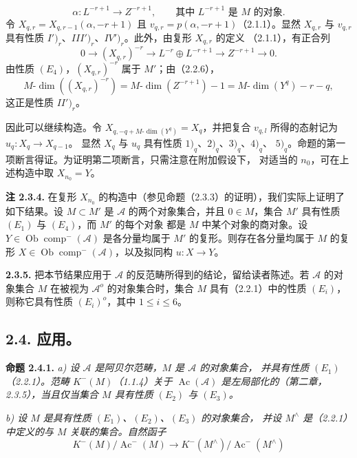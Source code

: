 \clearpage
{}%
\begingroup\small\setlength{\parskip}{0pt}\setlength{\emergencystretch}{1.5em}
\setlength{\abovedisplayskip}{4pt plus 2pt minus 2pt}%
\setlength{\belowdisplayskip}{4pt plus 2pt minus 2pt}%

\[
\alpha\colon L^{-r+1}\longrightarrow Z^{-r+1},
\qquad\text{其中 }L^{-r+1}\text{ 是 }M\text{ 的对象}.
\]
令 $X_{q,r}=X_{q,r-1}(\alpha,-r+1)$ 且
$v_{q,r}=p(\alpha,-r+1)$（2.1.1）。显然 $X_{q,r}$ 与 $v_{q,r}$ 具有性质
$I')_r$、$III')_r$、$IV')_r$。此外，由复形 $X_{q,r}$ 的定义
（2.1.1），有正合列
\[
0\longrightarrow (X_{q,r})^{-r}\longrightarrow
L^{-r}\oplus L^{-r+1}\longrightarrow Z^{-r+1}\longrightarrow0.
\]
由性质 $(E_4)$，$(X_{q,r})^{-r}$ 属于 $M'$；由（2.2.6），
\[
M\text{-}\dim((X_{q,r})^{-r})
=M\text{-}\dim(Z^{-r+1})-1
=M\text{-}\dim(Y^q)-r-q,
\]
这正是性质 $II')_r$。

因此可以继续构造。令 $X_{q,-q+M\text{-}\dim(Y^q)}=X_q$，并把复合
$v_{q,l}$ 所得的态射记为 $u_q\colon X_q\longrightarrow X_{q-1}$。
显然 $X_q$ 与 $u_q$ 具有性质 $1)_q$、$2)_q$、$3)_q$、$4)_q$、
$5)_q$。命题的第一项断言得证。为证明第二项断言，只需注意在附加假设下，
对适当的 $n_0$，可在上述构造中取 $X_{n_0}=Y$。

\medskip\noindent\textbf{注 2.3.4.}\quad
在复形 $X_{n_0}$ 的构造中（参见命题（2.3.3）的证明），我们实际上证明了
如下结果。设 $M\subset M'$ 是 $\mathcal A$ 的两个对象集合，并且
$0\in M$，集合 $M'$ 具有性质 $(E_1)$ 与 $(E_4)$，而 $M'$ 的每个对象
都是 $M$ 中某个对象的商对象。设
$Y\in\operatorname{Ob}\operatorname{comp}^{-}(\mathcal A)$ 是各分量均属于
$M'$ 的复形。则存在各分量均属于 $M$ 的复形
$X\in\operatorname{Ob}\operatorname{comp}^{-}(\mathcal A)$，以及拟同构
$u\colon X\longrightarrow Y$。

\medskip\noindent\textbf{2.3.5.}\quad
把本节结果应用于 $\mathcal A$ 的反范畴所得到的结论，留给读者陈述。若
$\mathcal A$ 的对象集合 $M$ 在被视为 $\mathcal A^o$ 的对象集合时，集合
$M$ 具有（2.2.1）中的性质 $(E_i)$，则称它具有性质 $(E_i)^o$，其中
$1\leq i\leq6$。

\subsection*{2.4. 应用。}

\noindent\textbf{命题 2.4.1.}\quad
\textit{a) 设 $\mathcal A$ 是阿贝尔范畴，$M$ 是 $\mathcal A$ 的对象集合，
并具有性质 $(E_1)$（2.2.1）。范畴 $K^{-}(M)$（1.1.4）关于
$\operatorname{Ac}(\mathcal A)$ 是左局部化的（第二章，2.3.5），当且仅当集合
$M$ 具有性质 $(E_2)$ 与 $(E_3)$。}

\noindent\textit{b) 设 $M$ 是具有性质 $(E_1)$、$(E_2)$、$(E_3)$ 的对象集合，
并设 $M^{\wedge}$ 是（2.2.1）中定义的与 $M$ 关联的集合。自然函子}
\[
K^{-}(M)/\operatorname{Ac}^{-}(M)
\longrightarrow
K^{-}(M^{\wedge})/\operatorname{Ac}^{-}(M^{\wedge})
\]
\endgroup
